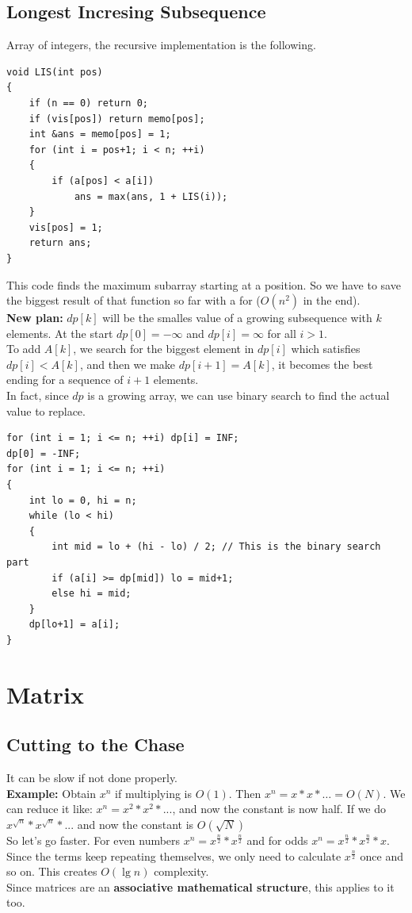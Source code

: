 \documentclass{IEEEtran}
\begin{document}
        \subsection{Longest Incresing Subsequence}
            Array of integers, the recursive implementation is the following.
            \begin{lstlisting}
void LIS(int pos) 
{
	if (n == 0) return 0;
	if (vis[pos]) return memo[pos];
	int &ans = memo[pos] = 1;
    for (int i = pos+1; i < n; ++i) 
    {
		if (a[pos] < a[i])
			ans = max(ans, 1 + LIS(i));
	}
	vis[pos] = 1;
	return ans;
}
            \end{lstlisting} 
            This code finds the maximum subarray starting at a position. So we have to save the biggest result of that function so far with a for ($O(n^2)$ in the end).\\
            \textbf{New plan:} $dp[k]$ will be the smalles value of a growing subsequence with $k$ elements. At the start $dp[0]=-\infty$ and $dp[i]=\infty$ for all $i>1$.\\
            To add $A[k]$, we search for the biggest element in $dp[i]$ which satisfies $dp[i] < A[k]$, and then we make $dp[i+1]=A[k]$, it becomes the best ending for a sequence of $i+1$ elements.\\
            In fact, since $dp$ is a growing array, we can use binary search to find the actual value to replace.
            \begin{lstlisting}
for (int i = 1; i <= n; ++i) dp[i] = INF;
dp[0] = -INF;
for (int i = 1; i <= n; ++i) 
{
	int lo = 0, hi = n;
    while (lo < hi) 
    {
		int mid = lo + (hi - lo) / 2; // This is the binary search part
		if (a[i] >= dp[mid]) lo = mid+1;
		else hi = mid;
	}
	dp[lo+1] = a[i];
}
            \end{lstlisting}

    \section{Matrix}
        \subsection{Cutting to the Chase}
            It can be slow if not done properly.\\
            \textbf{Example:} Obtain $x^n$ if multiplying is $O(1)$. Then $x^n=x*x*\ldots = O(N)$. We can reduce it like: $x^n=x^2*x^2*...$, and now the constant is now half. If we do $x^{\sqrt{n}}*x^{\sqrt{n}}*...$ and now the constant is $O(\sqrt{N})$\\
            So let's go faster. For even numbers $x^n=x^{\frac{n}{2}}*x^{\frac{n}{2}}$ and for odds $x^n = x^{\frac{n}{2}}*x^{\frac{n}{2}}*x$.\\
            Since the terms keep repeating themselves, we only need to calculate $x^{\frac{n}{2}}$ once and so on. This creates $O(\lg{n})$ complexity.\\
            Since matrices are an \textbf{associative mathematical structure}, this applies to it too.
\end{document}
